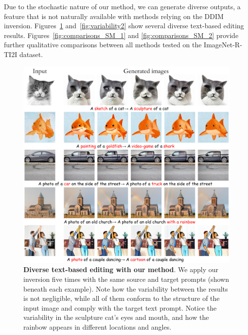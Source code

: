 Due to the stochastic nature of our method, we can generate diverse outputs, a feature that is not naturally available with methods relying on the DDIM inversion. Figures~\ref{fig:variability1} and~\ref{fig:variability2} show several diverse text-based editing results.  Figures~\ref{fig:comparisons_SM_1} and \ref{fig:comparisons_SM_2} provide further qualitative comparisons between all methods tested on the ImageNet-R-TI2I dataset. 



\begin{figure}[h]
\includegraphics[width=\textwidth]{ICCV23_submission/figures/DDPM_inversion_variability_1.pdf}
\caption{\textbf{Diverse text-based editing with our method}. We apply our inversion five times with the same source and target prompts (shown beneath each example). Note how the variability between the results is not negligible, while all of them conform to the structure of the input image and comply with the target text prompt. Notice \eg the variability in the sculpture cat's eyes and mouth, and how the rainbow appears in different locations and angles.}
\label{fig:variability1}
\end{figure}

